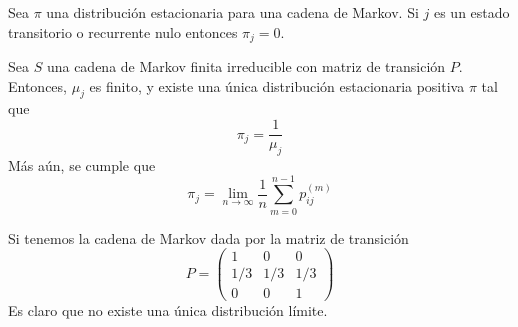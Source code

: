 \documentclass[PREyA.tex]{subfiles}
\begin{document}
\begin{prop}
Sea $\pi$ una distribución estacionaria para una cadena de Markov. Si $j$ es un estado transitorio o recurrente nulo entonces $\pi_j=0$.
\end{prop}
\begin{theorem}
Sea $S$ una cadena de Markov finita irreducible con matriz de transición $P$. Entonces, $\mu_j$ es finito, y existe una única distribución estacionaria positiva $\pi$ tal que
$$
\pi_j = \frac{1}{\mu_j}
$$
Más aún, se cumple que
$$
\pi_j = \lim_{n\to \infty} \frac{1}{n}\sum_{m=0}^{n-1}p_{ij}^{(m)}
$$
\end{theorem}
\begin{example}
Si tenemos la cadena de Markov dada por la matriz de transición
$$
P = 
\begin{pmatrix}
1 & 0 & 0 \\
1/3 & 1/3 & 1/3\\
0 & 0 & 1
\end{pmatrix}
$$
Es claro que no existe una única distribución límite.
\end{example}
\end{document}
